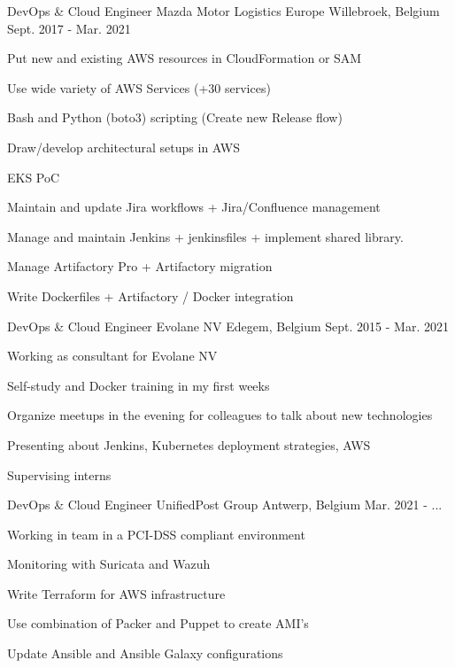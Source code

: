 \begin{cventries}
  \cventry
    {DevOps \& Cloud Engineer} %
    {Mazda Motor Logistics Europe} %
    {Willebroek, Belgium} %
    {Sept. 2017 - Mar. 2021} %
    {
      \begin{cvitems} %
        \item {Put new and existing AWS resources in CloudFormation or SAM}
        \item {Use wide variety of AWS Services (+30 services)}
        \item {Bash and Python (boto3) scripting (Create new Release flow)}
        \item {Draw/develop architectural setups in AWS}
        \item {EKS PoC}
        \item {Maintain and update Jira workflows + Jira/Confluence management}
        \item {Manage and maintain Jenkins + jenkinsfiles + implement shared library.}
        \item {Manage Artifactory Pro + Artifactory migration}
        \item {Write Dockerfiles + Artifactory / Docker integration}
      \end{cvitems}
    }

  \cventry
    {DevOps \& Cloud Engineer} %
    {Evolane NV} %
    {Edegem, Belgium} %
    {Sept. 2015 - Mar. 2021} %
    {
      \begin{cvitems} %
        \item {Working as consultant for Evolane NV}
        \item {Self-study and Docker training in my first weeks}
        \item {Organize meetups in the evening for colleagues to talk about new technologies}
        \item {Presenting about Jenkins, Kubernetes deployment strategies, AWS}
        \item {Supervising interns}
      \end{cvitems}
    }

  \cventry
    {DevOps \& Cloud Engineer} %
    {UnifiedPost Group} %
    {Antwerp, Belgium} %
    {Mar. 2021 - ...} %
    {
      \begin{cvitems} %
        \item {Working in team in a PCI-DSS compliant environment}
        \item {Monitoring with Suricata and Wazuh}
        \item {Write Terraform for AWS infrastructure}
        \item {Use combination of Packer and Puppet to create AMI's}
        \item {Update Ansible and Ansible Galaxy configurations}
      \end{cvitems}
    }

\end{cventries}
